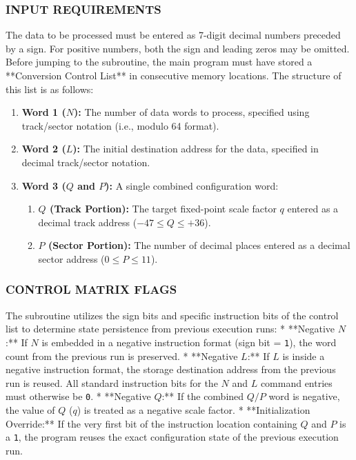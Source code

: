 \subsubsection*{INPUT REQUIREMENTS}
The data to be processed must be entered as 7-digit decimal numbers preceded by a sign. For positive numbers, both the sign and leading zeros may be omitted. Before jumping to the subroutine, the main program must have stored a **Conversion Control List** in consecutive memory locations. The structure of this list is as follows:

\begin{enumerate}
    \item \textbf{Word 1 ($N$):} The number of data words to process, specified using track/sector notation (i.e., modulo 64 format).
    \item \textbf{Word 2 ($L$):} The initial destination address for the data, specified in decimal track/sector notation.
    \item \textbf{Word 3 ($Q$ and $P$):} A single combined configuration word:
    \begin{enumerate}
        \item \textbf{$Q$ (Track Portion):} The target fixed-point scale factor $q$ entered as a decimal track address ($-47 \le Q \le +36$).
        \item \textbf{$P$ (Sector Portion):} The number of decimal places entered as a decimal sector address ($0 \le P \le 11$).
    \end{enumerate}
\end{enumerate}

\subsubsection*{CONTROL MATRIX FLAGS}
The subroutine utilizes the sign bits and specific instruction bits of the control list to determine state persistence from previous execution runs:
* **Negative $N$:** If $N$ is embedded in a negative instruction format (sign bit = \texttt{1}), the word count from the previous run is preserved.
* **Negative $L$:** If $L$ is inside a negative instruction format, the storage destination address from the previous run is reused. All standard instruction bits for the $N$ and $L$ command entries must otherwise be \texttt{0}.
* **Negative $Q$:** If the combined $Q/P$ word is negative, the value of $Q$ ($q$) is treated as a negative scale factor.
* **Initialization Override:** If the very first bit of the instruction location containing $Q$ and $P$ is a \texttt{1}, the program reuses the exact configuration state of the previous execution run.


